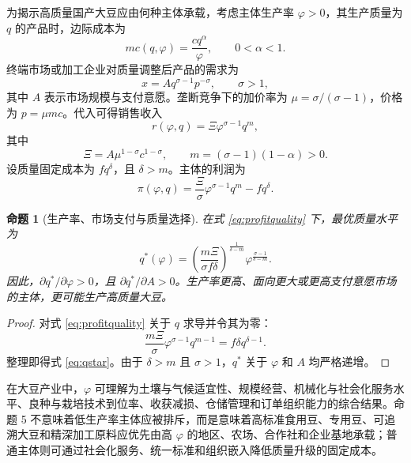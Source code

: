 \documentclass[UTF8,zihao=-4,fontset=fandol]{ctexart}
\numberwithin{equation}{section}
\newtheorem{proposition}{命题}
\theoremstyle{definition}
\theoremstyle{remark}
\begin{document}
为揭示高质量国产大豆应由何种主体承载，考虑主体生产率 $\varphi>0$，其生产质量为 $q$ 的产品时，边际成本为
\begin{equation}
 mc(q,\varphi)=\frac{cq^{\alpha}}{\varphi},\qquad 0<\alpha<1.
 \label{eq:mcquality}
\end{equation}
终端市场或加工企业对质量调整后产品的需求为
\begin{equation}
 x=Aq^{\sigma-1}p^{-\sigma},\qquad \sigma>1,
 \label{eq:qualitydemand}
\end{equation}
其中 $A$ 表示市场规模与支付意愿。垄断竞争下的加价率为 $\mu=\sigma/(\sigma-1)$，价格为 $p=\mu mc$。代入可得销售收入
\begin{equation}
 r(\varphi,q)=\Xi\varphi^{\sigma-1}q^m,
 \label{eq:revenuequality}
\end{equation}
其中
\begin{equation}
 \Xi=A\mu^{1-\sigma}c^{1-\sigma},\qquad m=(\sigma-1)(1-\alpha)>0.
 \label{eq:xi}
\end{equation}
设质量固定成本为 $fq^{\delta}$，且 $\delta>m$。主体的利润为
\begin{equation}
 \pi(\varphi,q)=\frac{\Xi}{\sigma}\varphi^{\sigma-1}q^m-fq^{\delta}.
 \label{eq:profitquality}
\end{equation}

\begin{proposition}[生产率、市场支付与质量选择]
在式 \eqref{eq:profitquality} 下，最优质量水平为
\begin{equation}
 q^*(\varphi)=\left(\frac{m\Xi}{\sigma f\delta}\right)^{\frac{1}{\delta-m}}
 \varphi^{\frac{\sigma-1}{\delta-m}}.
 \label{eq:qstar}
\end{equation}
因此，$\partial q^*/\partial\varphi>0$，且 $\partial q^*/\partial A>0$。生产率更高、面向更大或更高支付意愿市场的主体，更可能生产高质量大豆。
\end{proposition}

\begin{proof}
对式 \eqref{eq:profitquality} 关于 $q$ 求导并令其为零：
\begin{equation}
 \frac{m\Xi}{\sigma}\varphi^{\sigma-1}q^{m-1}=f\delta q^{\delta-1}.
\end{equation}
整理即得式 \eqref{eq:qstar}。由于 $\delta>m$ 且 $\sigma>1$，$q^*$ 关于 $\varphi$ 和 $A$ 均严格递增。\end{proof}

在大豆产业中，$\varphi$ 可理解为土壤与气候适宜性、规模经营、机械化与社会化服务水平、良种与栽培技术到位率、收获减损、仓储管理和订单组织能力的综合结果。命题 5 不意味着低生产率主体应被排斥，而是意味着高标准食用豆、专用豆、可追溯大豆和精深加工原料应优先由高 $\varphi$ 的地区、农场、合作社和企业基地承载；普通主体则可通过社会化服务、统一标准和组织嵌入降低质量升级的固定成本。
\end{document}
